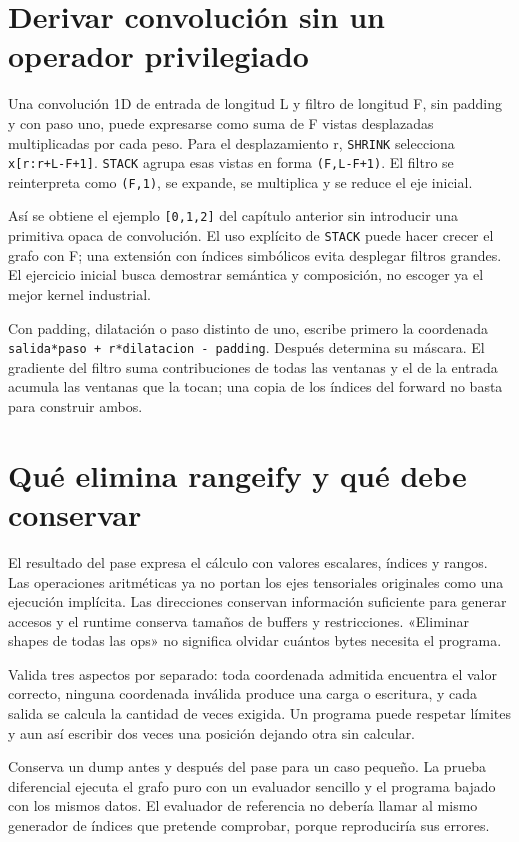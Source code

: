 \documentclass[12pt,a4paper,oneside]{report}
\begin{document}
\section{Derivar convolución sin un operador privilegiado}
Una convolución 1D de entrada de longitud L y filtro de longitud F, sin padding y con paso uno, puede expresarse como suma de F vistas desplazadas multiplicadas por cada peso. Para el desplazamiento r, \texttt{SHRINK} selecciona \texttt{x[r:r+L-F+1]}. \texttt{STACK} agrupa esas vistas en forma \texttt{(F,L-F+1)}. El filtro se reinterpreta como \texttt{(F,1)}, se expande, se multiplica y se reduce el eje inicial.

Así se obtiene el ejemplo \texttt{[0,1,2]} del capítulo anterior sin introducir una primitiva opaca de convolución. El uso explícito de \texttt{STACK} puede hacer crecer el grafo con F; una extensión con índices simbólicos evita desplegar filtros grandes. El ejercicio inicial busca demostrar semántica y composición, no escoger ya el mejor kernel industrial.

Con padding, dilatación o paso distinto de uno, escribe primero la coordenada \texttt{salida*paso \allowbreak{}+ r*dilataci\allowbreak{}on - padding}. Después determina su máscara. El gradiente del filtro suma contribuciones de todas las ventanas y el de la entrada acumula las ventanas que la tocan; una copia de los índices del forward no basta para construir ambos.

\section{Qué elimina rangeify y qué debe conservar}
El resultado del pase expresa el cálculo con valores escalares, índices y rangos. Las operaciones aritméticas ya no portan los ejes tensoriales originales como una ejecución implícita. Las direcciones conservan información suficiente para generar accesos y el runtime conserva tamaños de buffers y restricciones. «Eliminar shapes de todas las ops» no significa olvidar cuántos bytes necesita el programa.

Valida tres aspectos por separado: toda coordenada admitida encuentra el valor correcto, ninguna coordenada inválida produce una carga o escritura, y cada salida se calcula la cantidad de veces exigida. Un programa puede respetar límites y aun así escribir dos veces una posición dejando otra sin calcular.

Conserva un dump antes y después del pase para un caso pequeño. La prueba diferencial ejecuta el grafo puro con un evaluador sencillo y el programa bajado con los mismos datos. El evaluador de referencia no debería llamar al mismo generador de índices que pretende comprobar, porque reproduciría sus errores.
\end{document}
